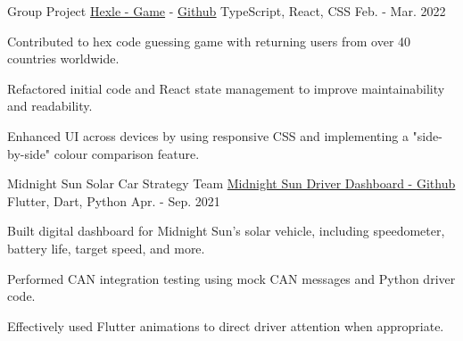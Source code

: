 

\begin{cventries}

  \cventry
    {Group Project} %
    {\href{https://frankljin.github.io/hexle/}{Hexle - \underline{Game}} - \href{https://github.com/frankljin/hexle/}{\underline{Github}}} %
    {TypeScript, React, CSS} %
    {Feb. - Mar. 2022} %
    {
      \begin{cvitems} %
        \item {Contributed to hex code guessing game with returning users from over 40 countries worldwide.}
        \item {Refactored initial code and React state management to improve maintainability and readability.}
        \item {Enhanced UI across devices by using responsive CSS and implementing a "side-by-side" colour comparison feature.}
      \end{cvitems}
    }

  \cventry
    {Midnight Sun Solar Car Strategy Team} %
    {\href{https://github.com/uw-midsun/telemetry_xiv}{Midnight Sun Driver Dashboard - \underline{Github}}} %
    {Flutter, Dart, Python} %
    {Apr. - Sep. 2021} %
    {
      \begin{cvitems} %
        \item {Built digital dashboard for Midnight Sun's solar vehicle, including speedometer, battery life, target speed, and more.}
        \item {Performed CAN integration testing using mock CAN messages and Python driver code.}
        \item {Effectively used Flutter animations to direct driver attention when appropriate.}
      \end{cvitems}
    }


\end{cventries}
